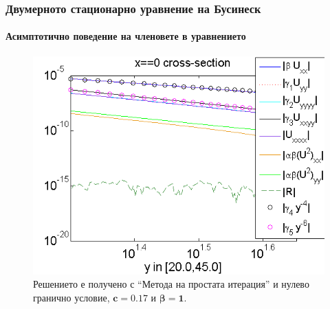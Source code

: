 \documentclass{beamer}
\begin{document}
\begin{frame}
\frametitle{Двумерното стационарно уравнение на Бусинеск}
\framesubtitle{Асимптотично поведение на членовете в уравнението}
\begin{figure}
	\includegraphics[width=0.8\linewidth]{../Thesis/AssymptForEachTerm/c017_bt1_5/ChristovIC_AlongY_50_ZB2_bt1_c017_h020_O(h^6).png}
	\caption{Решението е получено с ``Метода на простата итерация'' и нулево гранично условие, $\boldsymbol{c=0.17}$ и $\boldsymbol{\beta = 1}$. }
	\label{fig:assympt_c017bt11}
\end{figure}

\end{frame}

%
%
\end{document}
